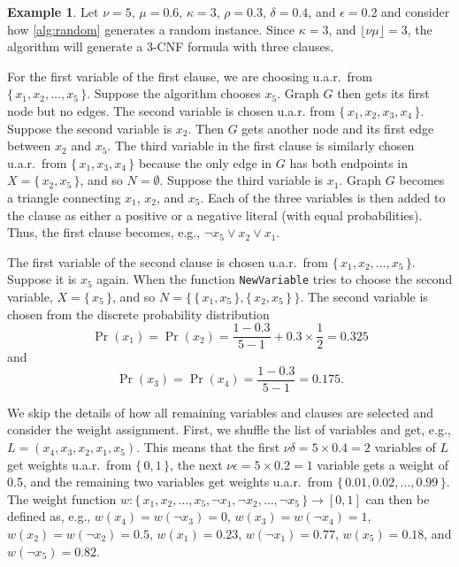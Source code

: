 \documentclass[letterpaper]{article} %
\theoremstyle{definition}
\newtheorem{example}{Example}
\theoremstyle{remark}
\begin{document}
\begin{example}\label{example:algorithm}
  Let $\nu = 5$, $\mu = 0.6$, $\kappa = 3$, $\rho = 0.3$, $\delta = 0.4$,
  and $\epsilon = 0.2$ and consider how \cref{alg:random} generates a random
  instance. Since $\kappa = 3$, and $\lfloor\nu\mu\rfloor = 3$,
  the algorithm will generate a 3-CNF formula with three clauses.

  For the first variable of the first clause, we are choosing u.a.r.\ from $\{\,
  x_1, x_2, \dots, x_5 \,\}$. Suppose the algorithm chooses $x_5$. Graph $G$
  then gets its first node but no edges. The second variable is chosen u.a.r.
  from $\{\, x_1, x_2, x_3, x_4 \,\}$. Suppose the second variable is $x_2$.
  Then $G$ gets another node and its first edge between $x_2$ and $x_5$. The
  third variable in the first clause is similarly chosen u.a.r.\ from $\{\, x_1,
  x_3, x_4 \,\}$ because the only edge in $G$ has both endpoints in $X = \{\,
  x_2, x_5 \,\}$, and so $N = \emptyset$. Suppose the third variable is $x_1$.
  Graph $G$ becomes a triangle connecting $x_1$, $x_2$, and $x_5$. Each of
  the three variables is then added to the clause as either a positive or a
  negative literal (with equal probabilities). Thus, the first clause becomes,
  e.g., $\neg x_5 \lor x_2 \lor x_1$.

  The first variable of the second clause is chosen u.a.r.\ from $\{\, x_1, x_2,
  \dots, x_5\,\}$. Suppose it is $x_5$ again. When the function
  \texttt{NewVariable} tries to choose the second variable, $X = \{\, x_5 \,\}$,
  and so $N = \{\, \{\, x_1, x_5 \,\}, \{\, x_2, x_5 \,\}\,\}$. The second
  variable is chosen from the discrete probability distribution
  \[
    \Pr(x_1) = \Pr(x_2) = \frac{1 - 0.3}{5 - 1} + 0.3 \times \frac{1}{2} = 0.325
  \]
  and
  \[
    \Pr(x_3) = \Pr(x_4) = \frac{1 - 0.3}{5 - 1} = 0.175.
  \]

  We skip the details of how all remaining variables and clauses are selected
  and consider the weight assignment. First, we shuffle the list of variables
  and get, e.g., $L = (x_4, x_3, x_2, x_1, x_5)$. This means that the first
  $\nu\delta = 5 \times 0.4 = 2$ variables of $L$ get weights u.a.r.\ from $\{\,
  0, 1 \,\}$, the next $\nu\epsilon = 5 \times 0.2 = 1$ variable gets a weight
  of 0.5, and the remaining two variables get weights u.a.r.\ from $\{\,0.01,
  0.02, \dots, 0.99 \,\}$. The weight function $w\colon \{\, x_1, x_2, \dots,
  x_5, \neg x_1, \neg x_2, \dots, \neg x_5\,\} \to [0, 1]$ can then be defined
  as, e.g., $w(x_4) = w(\neg x_3) = 0$, $w(x_3) = w(\neg x_4) = 1$, $w(x_2) =
  w(\neg x_2) = 0.5$, $w(x_1) = 0.23$, $w(\neg x_1) = 0.77$, $w(x_5) = 0.18$,
  and $w(\neg x_5) = 0.82$.
\end{example}
\end{document}
